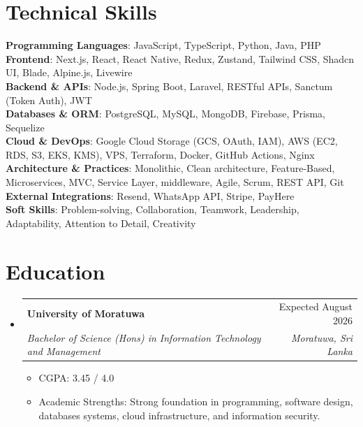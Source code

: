 \documentclass[letterpaper,11pt]{article}
\makeatletter
\newcommand{\resumeItem}[1]{
  \item\small{
    {#1 \vspace{-2pt}}
  }
}
\newcommand{\resumeSubheading}[4]{
  \vspace{-2pt}\item
    \begin{tabular*}{0.97\textwidth}[t]{l@{\extracolsep{\fill}}r}
      \textbf{#1} & #2 \\
      \textit{\small#3} & \textit{\small #4} \\
    \end{tabular*}\vspace{-7pt}
}
\newcommand{\resumeSubHeadingListStart}{\begin{itemize}[leftmargin=0.15in, label={}]}
\newcommand{\resumeSubHeadingListEnd}{\end{itemize}}
\newcommand{\resumeItemListStart}{\begin{itemize}}
\newcommand{\resumeItemListEnd}{\end{itemize}\vspace{-5pt}}
\makeatother
\begin{document}
\section{Technical Skills}
\begin{itemize}[leftmargin=0.15in, label={}]
  \small{\item{
    \textbf{Programming Languages}{:  JavaScript, TypeScript, Python, Java, PHP} \\
    \textbf{Frontend}{: Next.js, React, React Native, Redux, Zustand, Tailwind CSS, Shadcn UI, Blade, Alpine.js, Livewire} \\
    \textbf{Backend \& APIs}{: Node.js, Spring Boot, Laravel, RESTful APIs, Sanctum (Token Auth), JWT} \\
    \textbf{Databases \& ORM}{: PostgreSQL, MySQL, MongoDB, Firebase, Prisma, Sequelize} \\
    \textbf{Cloud \& DevOps}{: Google Cloud Storage (GCS, OAuth, IAM), AWS (EC2, RDS, S3, EKS, KMS), VPS, Terraform, Docker, GitHub Actions, Nginx} \\
    \textbf{Architecture \& Practices}{: Monolithic, Clean architecture, Feature-Based, Microservices, MVC, Service Layer, middleware, Agile, Scrum, REST API, Git} \\
    \textbf{External Integrations}{: Resend, WhatsApp API, Stripe, PayHere } \\
    \textbf{Soft Skills}{: Problem-solving, Collaboration, Teamwork, Leadership, Adaptability, Attention to Detail, Creativity}
  }}
\end{itemize}

\section{Education}
  \resumeSubHeadingListStart
    \resumeSubheading
      {University of Moratuwa}{Expected August 2026}
      {Bachelor of Science (Hons) in Information Technology and Management}{Moratuwa, Sri Lanka}
      \resumeItemListStart
        \resumeItem{CGPA: 3.45 / 4.0}
        \resumeItem{Academic Strengths: Strong foundation in programming, software design, databases systems, cloud infrastructure, and information security.}
      \resumeItemListEnd
  \resumeSubHeadingListEnd
\end{document}

